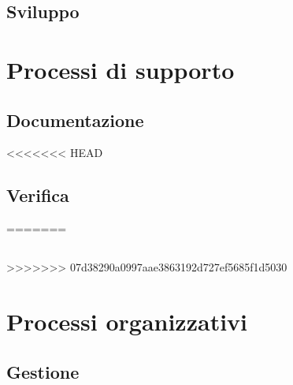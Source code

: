 \documentclass[a4paper,titlepage]{article}
\begin{document}
 \subsection{Sviluppo}
  
\section{Processi di supporto} 
 \subsection{Documentazione}  
<<<<<<< HEAD
 
 \subsection{Verifica} 
  
=======
 
 \subsection{} 
  
>>>>>>> 07d38290a0997aae3863192d727ef5685f1d5030
\section{Processi organizzativi}
 \subsection{Gestione}
  
\end{document}
